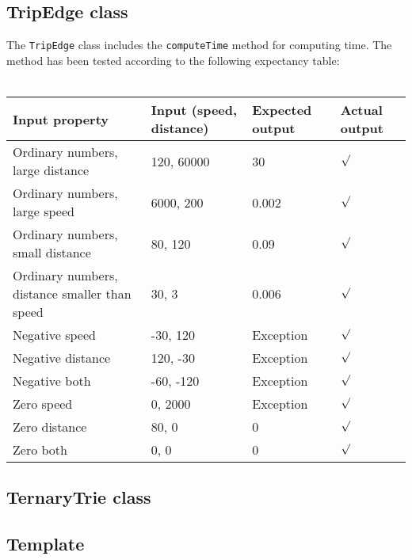 \documentclass[a4paper,11pt]{article}
\begin{document}
\pagebreak
\subsection{TripEdge class}
\label{sec:TripEdge class}
The \texttt{TripEdge} class includes the \texttt{computeTime} method for computing time. The method has been tested according to the following expectancy table: \\ \\
\begin{tabular}{ p{3.5cm} | p{2.5cm} | p{2.5cm} | p{2.5cm} }
	Input property & Input (speed, distance) & Expected output & Actual output \\
	\hline
	Ordinary numbers, large distance & 120, 60000 & 30 & $\surd$ \\
	Ordinary numbers, large speed & 6000, 200 & 0.002 & $\surd$ \\
	Ordinary numbers, small distance & 80, 120 & 0.09 & $\surd$ \\
	Ordinary numbers, distance smaller than speed & 30, 3 & 0.006 & $\surd$ \\
	Negative speed & -30, 120 & Exception & $\surd$ \\
	Negative distance & 120, -30 & Exception & $\surd$ \\
	Negative both & -60, -120 & Exception & $\surd$ \\
	Zero speed & 0, 2000 & Exception & $\surd$ \\
	Zero distance & 80, 0 & 0 & $\surd$ \\
	Zero both & 0, 0 & 0 & $\surd$
\end{tabular}

\pagebreak
\subsection{TernaryTrie class}




\pagebreak
\subsection{Template}
\end{document}
